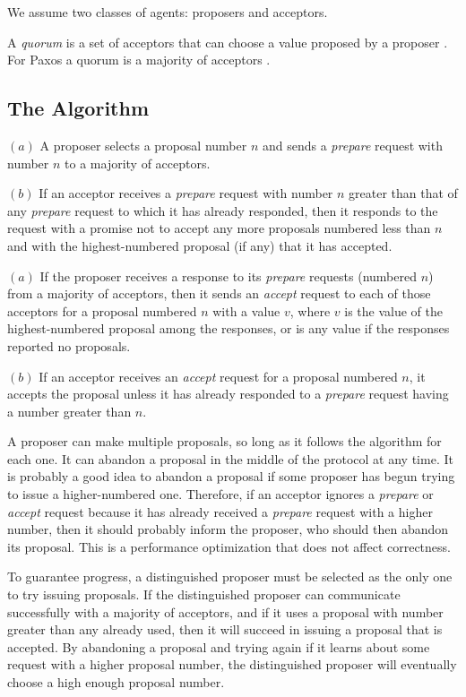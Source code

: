We assume two classes of agents: proposers and acceptors.

A \emph{quorum} is a set of acceptors that can choose a value proposed by a proposer \cite{Lamport06}.
For Paxos a quorum is a majority of acceptors \cite{Lamport06}.

\subsection{The Algorithm}

\begin{phase}
    $(a)$ A proposer selects a proposal number $n$ and sends a \emph{prepare} request with number $n$ to a majority of acceptors.
    
    $(b)$ If an acceptor receives a \emph{prepare} request with number $n$ greater than that of any \emph{prepare} request to which it has already responded, then it responds to the request with a promise not to accept any more proposals numbered less than $n$ and with the highest-numbered proposal (if any) that it has accepted.
\end{phase}

\begin{phase}
    $(a)$ If the proposer receives a response to its \emph{prepare} requests (numbered $n$) from a majority of acceptors, then it sends an \emph{accept} request to each of those acceptors for a proposal numbered $n$ with a value $v$, where $v$ is the value of the highest-numbered proposal among the responses, or is any value if the responses reported no proposals.

    $(b)$ If an acceptor receives an \emph{accept} request for a proposal numbered $n$, it accepts the proposal unless it has already responded to a \emph{prepare} request having a number greater than $n$.
\end{phase}

A proposer can make multiple proposals, so long as it follows the algorithm for each one.
It can abandon a proposal in the middle of the protocol at any time.
It is probably a good idea to abandon a proposal if some proposer has begun trying to issue a higher-numbered one.
Therefore, if an acceptor ignores a \emph{prepare} or \emph{accept} request because it has already received a \emph{prepare} request with a higher number, then it should probably inform the proposer, who should then abandon its proposal.
This is a performance optimization that does not affect correctness.

To guarantee progress, a distinguished proposer must be selected as the only one to try issuing proposals.
If the distinguished proposer can communicate successfully with a majority of acceptors, and if it uses a proposal with number greater than any already used, then it will succeed in issuing a proposal that is accepted.
By abandoning a proposal and trying again if it learns about some request with a higher proposal number, the distinguished proposer will eventually choose a high enough proposal number.

